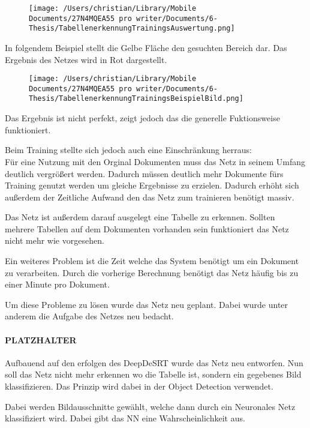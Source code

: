 \documentclass[
]{article}
\begin{document}
\begin{figure}
\centering
\texttt{[image: /Users/christian/Library/Mobile Documents/27N4MQEA55~pro~writer/Documents/6-Thesis/TabellenerkennungTrainingsAuswertung.png]}
\caption{}
\end{figure}

In folgendem Beispiel stellt die Gelbe Fläche den gesuchten Bereich dar.
Das Ergebnis des Netzes wird in Rot dargestellt.

\begin{figure}
\centering
\texttt{[image: /Users/christian/Library/Mobile Documents/27N4MQEA55~pro~writer/Documents/6-Thesis/TabellenerkennungTrainingsBeispielBild.png]}
\caption{}
\end{figure}

Das Ergebnis ist nicht perfekt, zeigt jedoch das die generelle
Fuktionsweise funktioniert.

Beim Training stellte sich jedoch auch eine Einschränkung herraus: \\
Für eine Nutzung mit den Orginal Dokumenten muss das Netz in seinem
Umfang deutlich vergrößert werden. Dadurch müssen deutlich mehr
Dokumente fürs Training genutzt werden um gleiche Ergebnisse zu
erzielen. Dadurch erhöht sich außerdem der Zeitliche Aufwand den das
Netz zum trainieren benötigt massiv.

Das Netz ist außerdem darauf ausgelegt eine Tabelle zu erkennen. Sollten
mehrere Tabellen auf dem Dokumenten vorhanden sein funktioniert das Netz
nicht mehr wie vorgesehen.

Ein weiteres Problem ist die Zeit welche das System benötigt um ein
Dokument zu verarbeiten. Durch die vorherige Berechnung benötigt das
Netz häufig bis zu einer Minute pro Dokument.

Um diese Probleme zu lösen wurde das Netz neu geplant. Dabei wurde unter
anderem die Aufgabe des Netzes neu bedacht.

\hypertarget{header-n122}{%
\paragraph{PLATZHALTER}\label{header-n122}}

Aufbauend auf den erfolgen des DeepDeSRT wurde das Netz neu entworfen.
Nun soll das Netz nicht mehr erkennen wo die Tabelle ist, sondern ein
gegebenes Bild klassifizieren. Das Prinzip wird dabei in der Object
Detection verwendet.

Dabei werden Bildausschnitte gewählt, welche dann durch ein Neuronales
Netz klassifiziert wird. Dabei gibt das NN eine Wahrscheinlichkeit aus.
\end{document}
